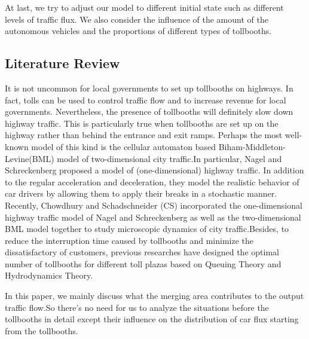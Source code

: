 At last, we try to adjust our model to different initial state such as different levels of traffic flux. We also consider the influence of the amount of the autonomous vehicles and the proportions of different types of tollbooths.
\subsection{Literature Review}
It is not uncommon for local governments to set up tollbooths on highways. In fact, tolls can be used to control traffic flow and to increase revenue for local governments. Nevertheless, the presence of tollbooths will definitely slow down highway traffic. This is particularly true when tollbooths are set up on the highway rather than behind the entrance and exit ramps. Perhaps the most well-known model of this kind is the cellular automaton based Biham-Middleton-Levine(BML) model of two-dimensional city traffic.In particular, Nagel and Schreckenberg proposed a model of (one-dimensional) highway traffic. In addition to the regular acceleration and deceleration, they model the realistic behavior of car drivers by allowing them to apply their breaks in a stochastic manner. Recently, Chowdhury and Schadschneider (CS) incorporated the one-dimensional highway traffic model of Nagel and Schreckenberg as well as the two-dimensional BML model together to study microscopic dynamics of city traffic.Besides, to reduce the interruption time caused by tollbooths and minimize the dissatisfactory of customers, previous researches have designed the optimal number of tollbooths for different toll plazas based on Queuing Theory and Hydrodynamics Theory. 

In this paper, we mainly discuss what the merging area contributes to the output traffic flow.So there's no need for us to analyze the situations before the tollbooths in detail except their influence on the distribution of car flux starting from the tollbooths.



